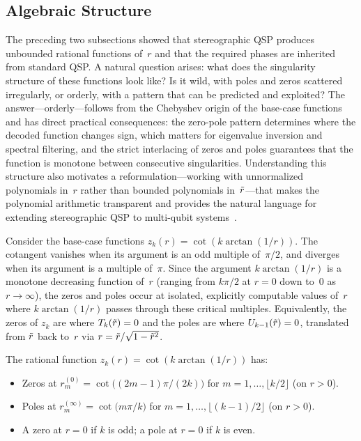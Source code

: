 \subsection{Algebraic Structure}
\label{subsec:zeros-poles}

The preceding two subsections showed that stereographic QSP
produces unbounded rational functions of~$r$ and that the
required phases are inherited from standard QSP.  A natural
question arises: what does the singularity structure of these
functions look like?  Is it wild, with poles and zeros
scattered irregularly, or orderly, with a pattern that
can be predicted and exploited?  The answer---orderly---follows
from the Chebyshev origin of the base-case functions and has
direct practical consequences: the zero-pole pattern determines
where the decoded function changes sign, which matters for
eigenvalue inversion and spectral filtering, and the strict
interlacing of zeros and poles guarantees that the function is
monotone between consecutive singularities.  Understanding this
structure also motivates a reformulation---working with
unnormalized polynomials in~$r$ rather than bounded polynomials
in~$\tilde{r}$---that makes the polynomial arithmetic transparent
and provides the natural language for extending stereographic
QSP to multi-qubit
systems~\cite{KharaziLeytonOrtega2026b}.

Consider the base-case functions
$z_k(r) = \cot(k\arctan(1/r))$.  The cotangent vanishes when
its argument is an odd multiple of~$\pi/2$, and diverges when
its argument is a multiple of~$\pi$.  Since the argument
$k\arctan(1/r)$ is a monotone decreasing function of~$r$
(ranging from $k\pi/2$ at $r=0$ down to~$0$ as
$r \to \infty$), the zeros and poles occur at isolated,
explicitly computable values of~$r$ where
$k\arctan(1/r)$ passes through these critical multiples.
Equivalently, the zeros of $z_k$ are where
$T_k(\tilde{r}) = 0$ and the poles are where
$U_{k-1}(\tilde{r}) = 0$, translated from $\tilde{r}$ back
to~$r$ via $r = \tilde{r}/\sqrt{1-\tilde{r}^2}$.

\begin{proposition}
	\label{prop:zeros-poles}
	The rational function $z_k(r) = \cot(k\arctan(1/r))$ has:
	\begin{itemize}
		\item Zeros at $r_m^{(0)} = \cot\!\bigl((2m{-}1)\pi/(2k)\bigr)$ for $m = 1, \ldots, \lfloor k/2\rfloor$ (on $r > 0$).
		\item Poles at $r_m^{(\infty)} = \cot\!\bigl(m\pi/k\bigr)$ for $m = 1, \ldots, \lfloor(k-1)/2\rfloor$ (on $r > 0$).
		\item A zero at $r = 0$ if $k$ is odd; a pole at $r = 0$ if $k$ is even.
	\end{itemize}
\end{proposition}

